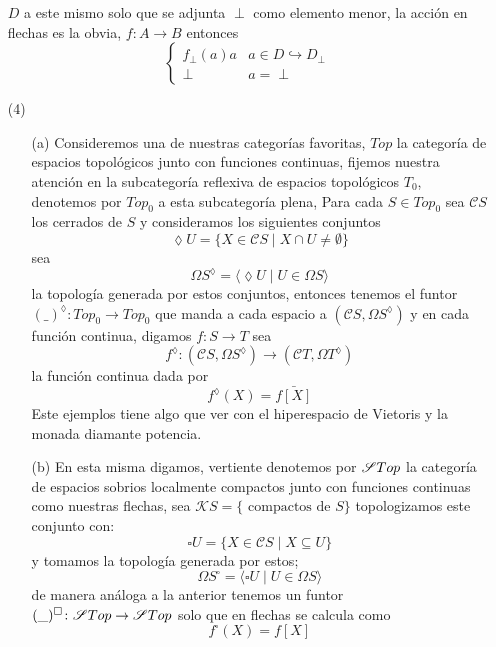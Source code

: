 \documentclass{comunicaciones}
\begin{document}
\begin{itemize}
$D$ a este mismo solo que se adjunta $\perp$ como elemento menor, la acción en flechas es la obvia, $f\colon A\rightarrow B$ entonces \[\begin{cases} f_{\perp}(a)
    a & a\in D\hookrightarrow D_{\perp} \\
    \perp & a=\perp
  \end{cases}\]
  \item[(4)]
  \begin{enumerate}
 \item[(a)] Consideremos una de nuestras categorías favoritas, $Top$ la categoría de espacios topológicos junto con funciones continuas,
fijemos nuestra atención en la subcategoría reflexiva de espacios topológicos $T_{0}$, denotemos por $Top_{0}$ a esta subcategoría plena, 
 Para cada $S\in Top_{0}$ sea $\mathcal{C}S$ los cerrados de $S$ y consideramos los siguientes conjuntos \[\lozenge U=\{X\in\mathcal{C}S\mid X\cap U\neq\emptyset\}\]
sea \[\Omega S^{\lozenge }=\langle\lozenge U\mid U\in\Omega S \rangle \] la topología generada por estos conjuntos, entonces tenemos el funtor $(\_)^{\lozenge}\colon Top_{0}\rightarrow Top_{0}$
que manda a cada espacio a $(\mathcal{C}S, \Omega S^{\lozenge })$ y en cada función continua, digamos $f\colon S\rightarrow T$ sea 
\[f^{\lozenge}\colon(\mathcal{C}S, \Omega S^{\lozenge })\rightarrow (\mathcal{C}T, \Omega T^{\lozenge })\] la función continua dada por \[f^{\lozenge}(X)=\bar{f[X]}\] Este ejemplos tiene algo que ver
con el hiperespacio de Vietoris y la monada diamante potencia.
\item[(b)]
En esta misma digamos, vertiente denotemos por $\EuScript{S}Top$ la categoría de espacios sobrios localmente compactos junto con funciones continuas como nuestras flechas,
sea $\mathcal{K}S=\{\text{ compactos de } S\}$ topologizamos este conjunto con: 
\[\square  U=\{X\in\mathcal{C}S\mid X\subseteq U\}\] y tomamos la topología generada por estos; 
\[\Omega S^{\square }=\langle\square U\mid U\in\Omega S\rangle \]
de manera análoga a la anterior tenemos un funtor $(\_)^{\square}\colon \EuScript{S}Top\rightarrow \EuScript{S}Top$ solo que en flechas se calcula como \[f^{\square}(X)=f[X]\]
  \end{enumerate}
\end{itemize}
\end{document}
